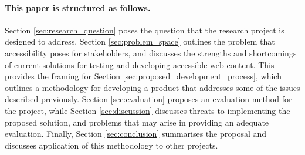 \paragraph{This paper is structured as follows.} %
\label{par:paragraph_name}
 Section \ref{sec:research_question} poses the question that the research project is designed to address. Section \ref{sec:problem_space} outlines the problem that accessibility poses for stakeholders, and discusses the strengths and shortcomings of current solutions for testing and developing accessible web content. This provides the framing for Section \ref{sec:proposed_development_process}, which outlines a methodology for developing a product that addresses some of the issues described previously. Section \ref{sec:evaluation} proposes an evaluation method for the project, while Section \ref{sec:discussion} discusses threats to implementing the proposed solution, and problems that may arise in providing an adequate evaluation. Finally, Section \ref{sec:conclusion} summarises the proposal and discusses application of this methodology to other projects.

